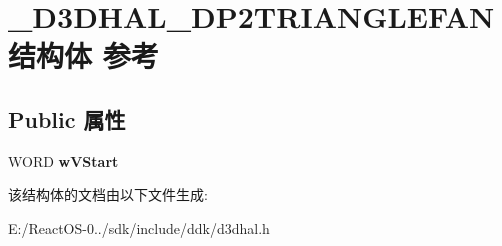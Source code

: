 \hypertarget{struct___d3_d_h_a_l___d_p2_t_r_i_a_n_g_l_e_f_a_n}{}\section{\+\_\+\+D3\+D\+H\+A\+L\+\_\+\+D\+P2\+T\+R\+I\+A\+N\+G\+L\+E\+F\+A\+N结构体 参考}
\label{struct___d3_d_h_a_l___d_p2_t_r_i_a_n_g_l_e_f_a_n}
\subsection*{Public 属性}
\begin{DoxyCompactItemize}
\item 
\mbox{\label{struct___d3_d_h_a_l___d_p2_t_r_i_a_n_g_l_e_f_a_n_a4d6b92c57110fe6e004c95010b5f03bd}} 
W\+O\+RD {\bfseries w\+V\+Start}
\end{DoxyCompactItemize}


该结构体的文档由以下文件生成\+:\begin{DoxyCompactItemize}
\item 
E\+:/\+React\+O\+S-\/0../sdk/include/ddk/d3dhal.\+h\end{DoxyCompactItemize}
